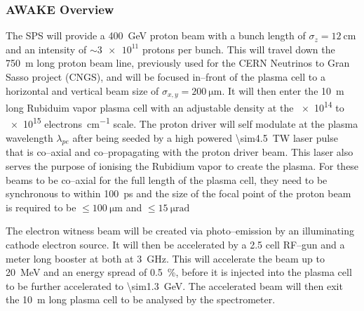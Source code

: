 \subsubsection{AWAKE Overview}

The SPS will provide a \SI{400}{\giga\electronvolt} proton beam with a bunch
length of \(\sigma_z = \SI{12}{\centi\meter}\) and an intensity of \(\sim
\num{3e11}\) protons per bunch. This will travel down the \SI{750}{\meter} long
proton beam line, previously used for the CERN Neutrinos to Gran Sasso project
(CNGS), and will be focused in--front of the plasma cell to a horizontal and
vertical beam size of \(\sigma_{x,y} = \SI{200}{\micro\meter}\). It will
then enter the \SI{10}{\meter} long Rubiduim vapor plasma cell with an
adjustable density at the \num{e14} to \num{e15} \si{electrons\per\centi\meter}
scale.
The proton driver will self modulate at the plasma wavelength \(\lambda_{pe}\)
after being seeded by a high powered \SI{\sim4.5}{\tera\watt} laser
pulse that is co--axial and co--propagating with the proton driver beam. This
laser also serves the purpose of ionising the Rubidium vapor to create the
plasma. For these beams to be co--axial for the full length of the plasma cell,
they need to be synchronous to within \SI{100}{\pico\second} and the size of the
focal point of the proton beam is required to be \(\le\SI{100}{\micro\meter}\)
and \(\le\SI{15}{\micro\radian}\)

The electron witness beam will be created via photo--emission by an illuminating
cathode electron source. It will then be accelerated by a \num{2.5} cell RF--gun
and a meter long booster at both at \SI{3}{\giga\hertz}.  This will accelerate
the beam up to \SI{20}{\mega\electronvolt} and an energy spread of
\SI{0.5}{\percent}, before it is injected into the plasma cell to be further
accelerated to \SI{\sim1.3}{\giga\electronvolt}.  The accelerated beam will
then exit the \SI{10}{\meter} long plasma cell to be analysed by the
spectrometer.





